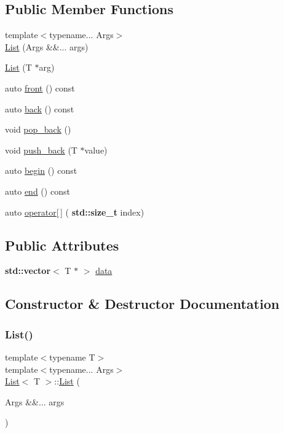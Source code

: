 \subsection*{Public Member Functions}
\begin{DoxyCompactItemize}
\item 
{\footnotesize template$<$typename... Args$>$ }\\\hyperlink{struct_list_a622a2ade2682950b9346ac692b17039c}{List} (Args \&\&... args)
\item 
\hyperlink{struct_list_ac1fba3a80d1d7fffbd2c1853a624f40a}{List} (T $\ast$arg)
\item 
auto \hyperlink{struct_list_a4efaea597a8cea09cc9e7717e6a9f80a}{front} () const
\item 
auto \hyperlink{struct_list_a6949268f152305afc5bac0ee3e5bb838}{back} () const
\item 
void \hyperlink{struct_list_a42e1aee3e26b76b3f4d9386efa7fe8b7}{pop\+\_\+back} ()
\item 
void \hyperlink{struct_list_af4ca3dd63fcff83845b673dfd7d5d715}{push\+\_\+back} (T $\ast$value)
\item 
auto \hyperlink{struct_list_afa6f9828eab89e2fcae63b612927fabb}{begin} () const
\item 
auto \hyperlink{struct_list_a22f91e0dfc7ab053952fc8ed33e5cd53}{end} () const
\item 
auto \hyperlink{struct_list_a40b4d77cbee9b7c311c304cafbf07d1e}{operator\mbox{[}$\,$\mbox{]}} (\textbf{ std\+::size\+\_\+t} index)
\end{DoxyCompactItemize}
\subsection*{Public Attributes}
\begin{DoxyCompactItemize}
\item 
\textbf{ std\+::vector}$<$ T $\ast$ $>$ \hyperlink{struct_list_a63c9cd234577800ed4664dcefebba10e}{data}
\end{DoxyCompactItemize}


\subsection{Constructor \& Destructor Documentation}
\mbox{\label{struct_list_a622a2ade2682950b9346ac692b17039c}} 
\subsubsection{\texorpdfstring{List()}{List()}\hspace{0.1cm}{\footnotesize\ttfamily [1/2]}}
{\footnotesize\ttfamily template$<$typename T$>$ \\
template$<$typename... Args$>$ \\
\hyperlink{struct_list}{List}$<$ T $>$\+::\hyperlink{struct_list}{List} (\begin{DoxyParamCaption}\item[{Args \&\&...}]{args }\end{DoxyParamCaption})\hspace{0.3cm}{\ttfamily [inline]}}

